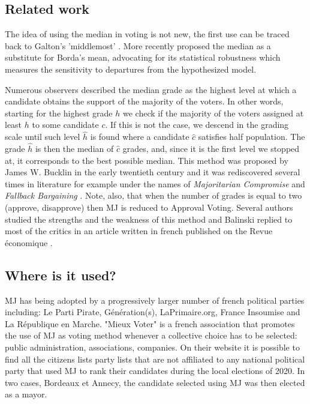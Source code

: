 \documentclass[version=3.21, pagesize, twoside=off, bibliography=totoc, DIV=calc, fontsize=12pt, a4paper]{scrartcl}
\begin{document}

\subsection{Related work}

The idea of using the median in voting is not new, the first use can be traced back to Galton's 'middlemost' \citep{Galton1907a,Galton1907b}. More recently \citet{Bassett1999} proposed the median as a substitute for Borda's mean, advocating for its statistical robustness \textemdash which measures the sensitivity to departures from the hypothesized model.

Numerous observers described the median grade as the highest level at which a candidate obtains the support of the majority of the voters. In other words, starting for the highest grade $h$ we check if the majority of the voters assigned at least $h$ to some candidate $c$. If this is not the case, we descend in the grading scale until such level $\hat{h}$ is found where a candidate $\hat{c}$ satisfies half population. The grade $\hat{h}$ is then the median of $\hat{c}$ grades, and, since it is the first level we stopped at, it corresponds to the best possible median. This method was proposed by James W. Bucklin in the early twentieth century \citep{Hoag1926} and it was rediscovered several times in literature for example under the names of \textit{Majoritarian Compromise} \citep{Sertel1986,Sertel1999} and \textit{Fallback Bargaining} \citep{Brams2001}. Note, also, that when the number of grades is equal to two (approve, disapprove) then \acs{MJ} is reduced to Approval Voting. Several authors studied the strengths and the weakness of this method \citep{Felsenthal2008,Laslier2018} and Balinski replied to most of the critics in an article written in french published on the Revue économique \citep{Balinski2019}.


\subsection{Where is it used?}
\acs{MJ} has being adopted by a progressively larger number of french political parties including: Le Parti Pirate, Génération(s), LaPrimaire.org, France Insoumise and La République en Marche.
"Mieux Voter" \citep{MV} is a french association that promotes the use of \acs{MJ} as voting method whenever a collective choice has to be selected: public administration, associations, companies. On their website it is possible to find all the citizens lists \textendash party lists that are not affiliated to any national political party \textemdash that used \acs{MJ} to rank their candidates during the local elections of 2020. In two cases, Bordeaux et Annecy, the candidate selected using \acs{MJ} was then elected as a mayor. 
\end{document}
